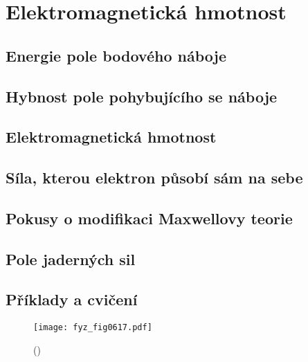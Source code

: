 \setchaptertoc
\chapter{Elektromagnetická hmotnost}\label{fyz:IIchapXXIIX}

  \section{Energie pole bodového náboje}\label{fyz:IIchapXXIIXsecI}
  \section{Hybnost pole pohybujícího se náboje}\label{fyz:IIchapXXIIXsecII}
  \section{Elektromagnetická hmotnost}\label{fyz:IIchapXXIIXsecIII}
  \section{Síla, kterou elektron působí sám na sebe}\label{fyz:IIchapXXIIXsecIV}
  \section{Pokusy o modifikaci Maxwellovy teorie}\label{fyz:IIchapXXIIXsecV}
  \section{Pole jaderných sil}\label{fyz:IIchapXXIIXsecVI}
  \section{Příklady a cvičení}\label{fyz:IIchapXXIIXsecVII}

    \begin{figure}[ht!] %
      \centering
      \texttt{[image: fyz\_fig0617.pdf]}
      \caption{
               (\cite[s.~707]{Feynman02})}
      \label{fyz:fig0617}
    \end{figure}

